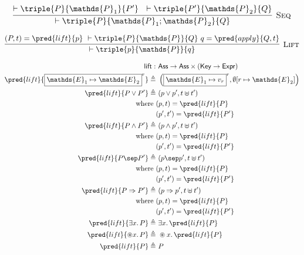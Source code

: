 \[
\infer[\textsc{Seq}]
{
	\vdash \triple
	{P}
	{\mathds{P}_1; \mathds{P}_2}
	{Q}
}
{
	\vdash \triple
	{P}
	{\mathds{P}_1}
	{P'}\ \
	\vdash \triple
	{P'}
	{\mathds{P}_2}
	{Q}
}
\]

\[
\infer[\textsc{Lift}]
{
	\vdash \triple
	{p}
	{\mathds{P}}
	{q}
}
{
	(P, t) = \pred{lift}{p}\
	\vdash \triple
	{P}
	{\mathds{P}}
	{Q}\
	q = \pred{apply}{Q, t}
}
\]

\begin{align*}
\mathsf{lift} :&\ \mathsf{Ass} \rightarrow \mathsf{Ass} \times (\mathsf{Key} \rightarrow \mathsf{Expr}) \\
\pred{lift}{\boxed{\mathds{E}_1 \mapsto \mathds{E}_2}^r} \triangleq&\ \left( \boxed{\mathds{E}_1 \mapsto v_r}^r, \emptyset[r \mapsto \mathds{E}_2] \right) \\
\pred{lift}{P \lor P'} \triangleq&\ (p \lor p', t \uplus t') \\
	\text{where }& (p, t) = \pred{lift}{P} \\
		& (p', t') = \pred{lift}{P'} \\
\pred{lift}{P \land P'} \triangleq&\ (p \land p', t \uplus t') \\
	\text{where }& (p, t) = \pred{lift}{P} \\
		& (p', t') = \pred{lift}{P'} \\
\pred{lift}{P \sep P'} \triangleq&\ (p \sep p', t \uplus t') \\
	\text{where }& (p, t) = \pred{lift}{P} \\
		& (p', t') = \pred{lift}{P'} \\
\pred{lift}{P \Rightarrow P'} \triangleq&\ (p \Rightarrow p', t \uplus t') \\
	\text{where }& (p, t) = \pred{lift}{P} \\
		& (p', t') = \pred{lift}{P'} \\
\pred{lift}{\exists x \ldotp P} \triangleq&\ \exists x \ldotp \pred{lift}{P} \\
\pred{lift}{\circledast x \ldotp P} \triangleq&\ \circledast x \ldotp \pred{lift}{P} \\
\pred{lift}{P} \triangleq&\ P
\end{align*}

